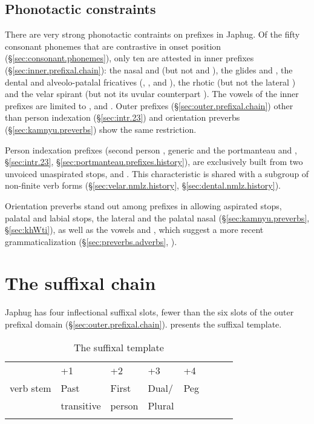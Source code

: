 \subsection{Phonotactic constraints} \label{sec:prefix.phonotactic}
There are very strong phonotactic contraints on prefixes in Japhug. Of the fifty consonant phonemes that are contrastive in onset position (§\ref{sec:consonant.phonemes}), only ten are attested in inner prefixes (§\ref{sec:inner.prefixal.chain}): the nasal  and  (but not  and ), the glides  and , the dental and alveolo-patalal fricatives (, ,  and ), the rhotic  (but not the lateral ) and the velar spirant  (but not its uvular counterpart ). The vowels of the inner prefixes are limited to ,  and . Outer prefixes (§\ref{sec:outer.prefixal.chain}) other than person indexation (§\ref{sec:intr.23}) and orientation preverbs (§\ref{sec:kamnyu.preverbs}) show the same restriction.
 
Person indexation prefixes (second person , generic  and the portmanteau  and , §\ref{sec:intr.23}, §\ref{sec:portmanteau.prefixes.history}), are exclusively built from two  unvoiced unaspirated stops,   and . This characteristic is shared with a subgroup of non-finite verb forms (§\ref{sec:velar.nmlz.history}, §\ref{sec:dental.nmlz.history}).
  
Orientation preverbs stand out among prefixes in allowing aspirated stops, palatal and labial stops, the lateral  and the palatal nasal (§\ref{sec:kamnyu.preverbs}, §\ref{sec:khWti}), as well as the vowels  and , which suggest a more recent grammaticalization (§\ref{sec:preverbs.adverbs}, \citealt[92]{jacques12agreement}).  

\section{The suffixal chain}  \label{sec:suffixes}

Japhug has four inflectional suffixal slots, fewer than the six slots of the outer prefixal domain (§\ref{sec:outer.prefixal.chain}).  presents the suffixal template.

\begin{table}
\caption{The suffixal template }\label{tab:template.suff}
\begin{tabular}{llllllll}
\lsptoprule
  0  &+1&+2&+3&+4  \\
verb stem & Past & First  & Dual/ & Peg\\
&transitive &person&Plural&\\
\lspbottomrule
\end{tabular}
\end{table}

